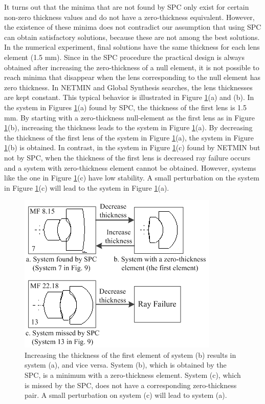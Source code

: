 It turns out that the minima that are not found by SPC only exist for certain non-zero thickness values and do not have a zero-thickness equivalent. However, the existence of these minima does not contradict our assumption that using SPC can obtain satisfactory solutions, because these are not among the best solutions. In the numerical experiment, final solutions have the same thickness for each lens element (1.5 mm). Since in the SPC procedure the practical design is always obtained after increasing the zero-thickness of a null element, it is not possible to reach minima that disappear when the lens corresponding to the null element has zero thickness. In NETMIN and Global Synthesis searches, the lens thicknesses are kept constant. This typical behavior is illustrated in Figure \ref{fig:thicknesschange}(a) and (b). In the system in Figures \ref{fig:thicknesschange}(a) found by SPC, the thickness of the first lens is 1.5 mm. By starting with a zero-thickness null-element as the first lens as in Figure \ref{fig:thicknesschange}(b), increasing the thickness leads to the system in Figure \ref{fig:thicknesschange}(a). By decreasing the thickness of the first lens of the system in Figure \ref{fig:thicknesschange}(a), the system in Figure \ref{fig:thicknesschange}(b) is obtained. In contrast, in the system in Figure \ref{fig:thicknesschange}(c) found by NETMIN but not by SPC, when the thickness of the first lens is decreased ray failure occurs and a system with zero-thickness element cannot be obtained. However, systems like the one in Figure \ref{fig:thicknesschange}(c) have low stability. A small perturbation on the system in Figure \ref{fig:thicknesschange}(c) will lead to the system in Figure \ref{fig:thicknesschange}(a).

\begin{figure}[h!]
    \centering
    \includegraphics[scale=0.7]{chapter-3/figures/thicknesschange.png}
    \caption{Increasing the thickness of the first element of system (b) results in system (a), and vice versa. System (b), which is obtained by the SPC, is a minimum with a zero-thickness element. System (c), which is missed by the SPC, does not have a corresponding zero-thickness pair. A small perturbation on system (c) will lead to system (a).}
    \label{fig:thicknesschange}
\end{figure}


